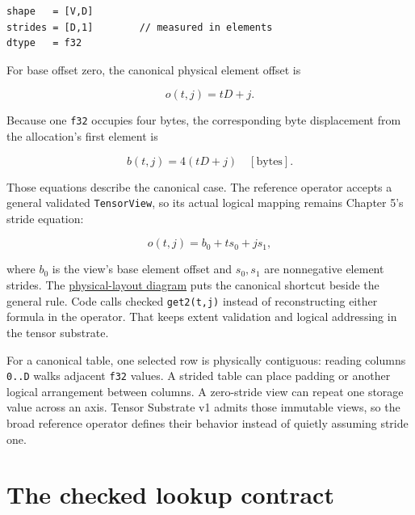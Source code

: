 \begin{verbatim}
shape   = [V,D]
strides = [D,1]        // measured in elements
dtype   = f32
\end{verbatim}

For base offset zero, the canonical physical element offset is

\begin{equation}
o(t,j)=tD+j.
\end{equation}

Because one \texttt{f32} occupies four bytes, the corresponding byte
displacement from the allocation's first element is

\begin{equation}
b(t,j)=4(tD+j)\quad[\mathrm{bytes}].
\end{equation}

Those equations describe the canonical case. The reference operator
accepts a general validated \texttt{TensorView}, so its actual logical
mapping remains Chapter 5's stride equation:

\begin{equation}
o(t,j)=b_0+t s_0+j s_1,
\end{equation}

where \(b_0\) is the view's base element offset and \(s_0,s_1\) are
nonnegative element strides. The
\href{https://github.com/hermonai/inside-the-llm-engine/blob/astra-visual-rewrite/diagrams/transformer/embedding-physical-layout.txt}{physical-layout
diagram} puts the canonical shortcut beside the general rule. Code calls
checked \texttt{get2(t,j)} instead of reconstructing either formula in
the operator. That keeps extent validation and logical addressing in the
tensor substrate.

For a canonical table, one selected row is physically contiguous:
reading columns \texttt{0..D} walks adjacent \texttt{f32} values. A
strided table can place padding or another logical arrangement between
columns. A zero-stride view can repeat one storage value across an axis.
Tensor Substrate v1 admits those immutable views, so the broad reference
operator defines their behavior instead of quietly assuming stride one.

\section{The checked lookup
contract}\label{the-checked-lookup-contract}


